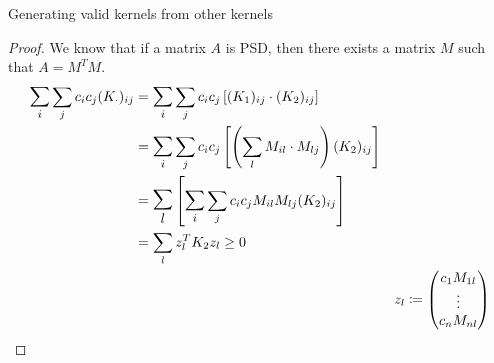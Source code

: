 \begin{theorem}[breakable]{Generating valid kernels from other kernels}{}
\begin{proof}
		We know that if a matrix $A$ is PSD, then there exists a matrix
		$M$ such that $A = M^TM$.
		\begin{align*}
			\mathlarger{\sum_i} \sum_j
			c_i c_j (K_\cdot)_{ij} & =
			\mathlarger{\sum_i} \sum_j
			c_i c_j \left[
				(K_1)_{ij} \cdot (K_2)_{ij}
			\right]                                                                                    \\
			                       & = \mathlarger{\sum_i} \sum_j
			c_i c_j \left[
				\left(
				\sum_l M_{il} \cdot M_{lj}
				\right) (K_2)_{ij}
			\right]                                                                                    \\
			                       & = \mathlarger{\mathlarger{\sum_l}}
			\left[
				\mathlarger{\sum_i} \sum_j c_i c_j M_{il} M_{lj} (K_2)_{ij}
			\right]                                                                                    \\
			                       & = \sum_l z_l^T K_2 z_l \geq 0                                     \\
			                       &                                    & z_l \coloneqq \begin{pmatrix}
				                                                                            c_1 M_{1l} \\
				                                                                            \vdots     \\
				                                                                            c_n M_{nl}
			                                                                            \end{pmatrix}
		\end{align*}
	\end{proof}


\end{theorem}

